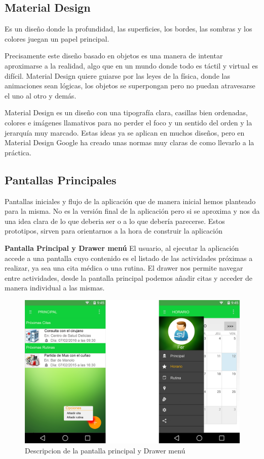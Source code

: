 \documentclass[../pfc.tex]{subfiles}
\begin{document}
		\subsection{Material Design}
		
		Es un diseño donde la profundidad, las superficies, los bordes, las sombras y los colores juegan un papel principal.
		
		Precisamente este diseño basado en objetos es una manera de intentar aproximarse a la realidad, algo que en un mundo donde todo es táctil y virtual es difícil. Material Design quiere guiarse por las leyes de la física, donde las animaciones sean lógicas, los objetos se superpongan pero no puedan atravesarse el uno al otro y demás.
		
		Material Design es un diseño con una tipografía clara, casillas bien ordenadas, colores e imágenes llamativos para no perder el foco y un sentido del orden y la jerarquía muy marcado. Estas ideas ya se aplican en muchos diseños, pero en Material Design Google ha creado unas normas muy claras de como llevarlo a la práctica.
		
		\subsection{Pantallas Principales}
		
			Pantallas iniciales y flujo de la aplicación que de manera inicial hemos planteado para la misma.
			No es la versión final de la aplicación pero si se aproxima y nos da una idea clara de lo que deberia ser o a lo que debería parecerse.
			Estos prototipos, sirven para orientarnos a la hora de construir la aplicación
			
			\textbf{Pantalla Principal y Drawer menú}
			El usuario, al ejecutar la aplicación accede a una pantalla cuyo contenido es el listado de las actividades próximas a realizar, ya sea una cita médica o una rutina.
			El drawer nos permite navegar entre actividades, desde la pantalla principal podemos añadir citas y acceder de manera individual a las mismas.
			 
			
			\begin{figure}
				\centering
				\includegraphics[width=0.7\linewidth]{../images/principal_2}
				\caption[Drawer menu y Pantalla principal]{Descripcion de la pantalla principal y Drawer menú}
				\label{fig:principal}
			\end{figure}
			
\end{document}
